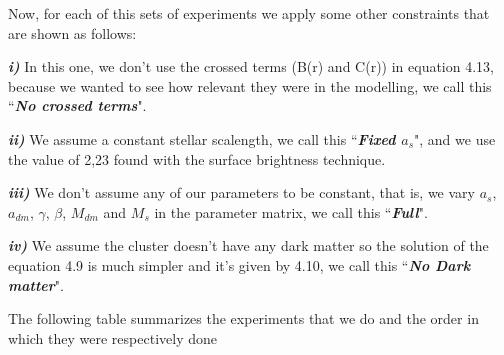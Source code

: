 Now, for each of this sets of experiments we apply some other constraints that are shown as follows: 

\textbf{\textit{i)}} In this one, we don't use the crossed terms (B(r) and C(r)) in equation 4.13, because we wanted to see how relevant they were in the modelling, we call this ``\textbf{\textit{No crossed terms}}". 

\textbf{\textit{ii)}} We assume a constant stellar scalength, we call this ``\textbf{\textit{Fixed $a_{s}$}}", and we use the value of 2,23 found with the surface brightness technique. 

\textbf{\textit{iii)}} We don't assume any of our parameters to be constant, that is, we vary $a_{s}$, $a_{dm}$, $\gamma$, $\beta$, $M_{dm}$ and $M_{s}$ in the parameter matrix, we call this ``\textbf{\textit{Full}}". 

\textbf{\textit{iv)}} We assume the cluster doesn't have any dark matter so the solution of the equation 4.9 is much simpler and it's given by 4.10, we call this ``\textbf{\textit{No Dark matter}}".

The following table summarizes the experiments that we do and the order in which they were respectively done

